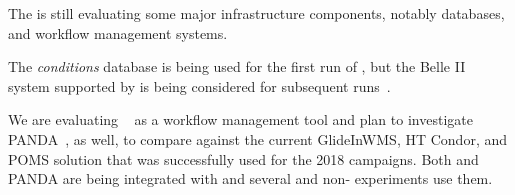 The   is still evaluating some major infrastructure components, notably databases, and workflow management systems.

The  \textit{conditions} database is being used for the first run of , but the Belle II~\cite{Ritter:2018jxh} system supported by  is being considered for subsequent runs~\cite{Laycock:2019ynk}. 

We are evaluating ~\cite{Falabella:2016waj} as a workflow management tool and plan to investigate PANDA~\cite{Megino:2017ywl}, as well, to compare against the current GlideInWMS, HT Condor, and POMS solution that was successfully used for the 2018  campaigns.
Both  and PANDA are being integrated with  and several  and non- experiments use them.
